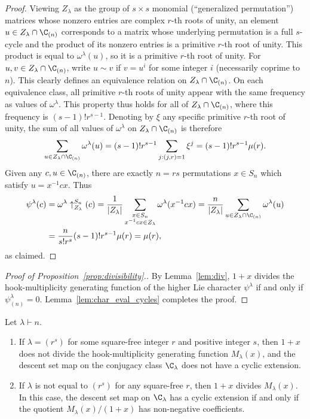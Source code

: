 \begin{proof}
    Viewing $Z_\lambda$ as the group of $s \times s$ monomial (``generalized permutation'') matrices whose nonzero entries are complex $r$-th roots of unity, an element $u \in Z_\lambda \cap \C_{(n)}$ corresponds to a matrix whose underlying permutation is a full $s$-cycle and the product of its nonzero entries is a primitive $r$-th root of unity.
    This product is equal to $\omega^\lambda(u)$, so it is a primitive $r$-th root of unity.
    For $u, v \in Z_\lambda \cap \C_{(n)}$, write $u \sim v$ if $v = u^i$ for some integer $i$ (necessarily coprime to $n$). This clearly defines an equivalence relation on $Z_\lambda \cap \C_{(n)}$. On each equivalence class, all primitive $r$-th roots of unity appear with the same frequency as values of $\omega^\lambda$. This property thus holds for all of $Z_\lambda \cap \C_{(n)}$, where this frequency is $(s-1)!r^{s-1}$. Denoting by $\xi$ any specific primitive $r$-th root of unity, the sum of all values of $\omega^\lambda$ on $Z_\lambda \cap \C_{(n)}$ is therefore
    \[
        \sum_{u\in Z_\lambda\cap\C_{(n)}} \omega^\lambda(u)
        = (s-1)! r^{s-1} \sum_{j:(j,r)=1} \xi^j
        = (s-1)! r^{s-1} \mu(r).
    \]
    Given any $c,u \in \C_{(n)}$, there are exactly $n=rs$ permutations $x \in S_n$ which satisfy $u=x^{-1}cx$.
    Thus
    \begin{align*}
        \psi^\lambda(c)
        &= \omega^\lambda\uparrow_{Z_\lambda}^{S_n}(c)
        = \frac{1}{|Z_\lambda|}\sum_{\substack{x \in S_n \\ x^{-1}cx \in Z_\lambda}} \omega^\lambda(x^{-1}cx)
        = \frac{n}{|Z_\lambda|}\sum_{u \in Z_\lambda\cap\C_{(n)}} \omega^\lambda(u) \\
        &= \frac{n}{s!r^s} (s-1)! r^{s-1} \mu(r)
        = \mu(r), 
    \end{align*}
    as claimed.
\end{proof}

\begin{proof}[Proof of Proposition~\ref{prop:divisibility}.]
	By Lemma~\ref{lem:div}, 
	$1+x$ divides the hook-multiplicity generating function of the higher Lie character $\psi^\lambda$ 
    if and only if $\psi^\lambda_{(n)}=0$.
    Lemma~\ref{lem:char_eval_cycles} completes the proof.
\end{proof}

\begin{corollary}\label{cor:only if}
    Let $\lambda \vdash n$.
    \begin{enumerate}
    \item
        If $\lambda = (r^s)$ for some square-free integer $r$ and positive integer $s$, then $1+x$ does not divide the hook-multiplicity generating function $M_\lambda(x)$, and the descent set map on the conjugacy class $\C_\lambda$ does not have a cyclic extension.
    \item 
        If $\lambda$ is not equal to $(r^s)$ for any square-free $r$, then $1+x$ divides $M_\lambda(x)$. 
        In this case, the descent set map on 
        $\C_\lambda$ has a cyclic extension if and only if 
        the quotient $M_\lambda(x)/(1+x)$ has non-negative coefficients.
    \end{enumerate}
\end{corollary}

